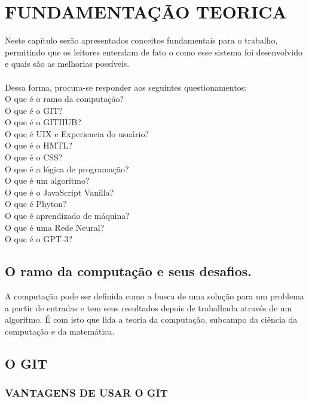 
\chapter{FUNDAMENTAÇÃO TEORICA}
\label{chap:delimitacao}

Neste capítulo serão apresentados conceitos fundamentais para o trabalho, permitindo que os leitores entendam de fato o como esse sistema foi desenvolvido e quais são as melhorias possíveis.\\
\\
Dessa forma, procura-se responder aos seguintes questionamentos:\\
O que é o ramo da computação?\\
O que é o GIT?\\
O que é o GITHUB?\\ 
O que é UIX e Experiencia do usuário?\\ 
O que é o HMTL?\\
O que é o CSS?\\
O que é a lógica de programação?\\ 
O que é um algoritmo?\\
O que é o JavaScript Vanilla?\\
O que é Phyton?\\
O que é aprendizado de máquina?\\
O que é uma Rede Neural?\\
O que é o GPT-3? 

\section{O ramo da computação e seus desafios.}
\label{sec:RamoComputacaoDesafios}
	A computação pode ser definida como a busca de uma solução para um problema a partir de entradas e tem seus resultados depois de trabalhada através de um algoritmo. É com isto que lida a teoria da computação, subcampo da ciência da computação e da matemática. 

\section{O GIT}
\label{sec:OGIT}

	\subsection{VANTAGENS DE USAR O GIT}
	\label{sec:VANTAGENSGIT}

